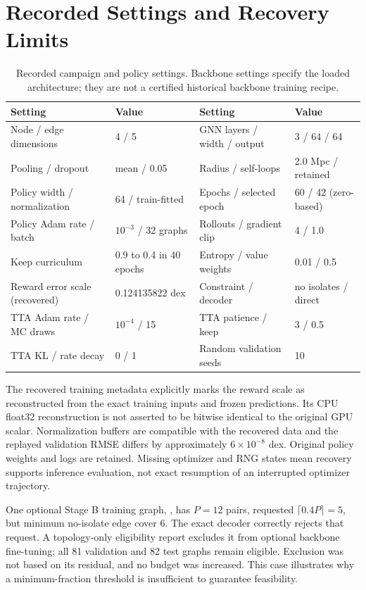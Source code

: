 \section{Recorded Settings and Recovery Limits}
\begin{table}[H]
\centering\small
\caption{Recorded campaign and policy settings. Backbone settings specify the loaded architecture; they are not a certified historical backbone training recipe.}
\begin{tabular}{llll}
\toprule
Setting & Value & Setting & Value \\
\midrule
Node / edge dimensions & 4 / 5 & GNN layers / width / output & 3 / 64 / 64 \\
Pooling / dropout & mean / 0.05 & Radius / self-loops & 2.0 Mpc / retained \\
Policy width / normalization & 64 / train-fitted & Epochs / selected epoch & 60 / 42 (zero-based) \\
Policy Adam rate / batch & $10^{-3}$ / 32 graphs & Rollouts / gradient clip & 4 / 1.0 \\
Keep curriculum & 0.9 to 0.4 in 40 epochs & Entropy / value weights & 0.01 / 0.5 \\
Reward error scale (recovered) & 0.124135822 dex & Constraint / decoder & no isolates / direct \\
TTA Adam rate / MC draws & $10^{-4}$ / 15 & TTA patience / keep & 3 / 0.5 \\
TTA KL / rate decay & 0 / 1 & Random validation seeds & 10 \\
\bottomrule
\end{tabular}
\end{table}

The recovered training metadata explicitly marks the reward scale as reconstructed from the exact training inputs and frozen predictions. Its CPU float32 reconstruction is not asserted to be bitwise identical to the original GPU scalar. Normalization buffers are compatible with the recovered data and the replayed validation RMSE differs by approximately $6\times10^{-8}$ dex. Original policy weights and logs are retained. Missing optimizer and RNG states mean recovery supports inference evaluation, not exact resumption of an interrupted optimizer trajectory.

One optional Stage B training graph, , has $P=12$ pairs, requested $\lceil0.4P\rceil=5$, but minimum no-isolate edge cover 6. The exact decoder correctly rejects that request. A topology-only eligibility report excludes it from optional backbone fine-tuning; all 81 validation and 82 test graphs remain eligible. Exclusion was not based on its residual, and no budget was increased. This case illustrates why a minimum-fraction threshold is insufficient to guarantee feasibility.

